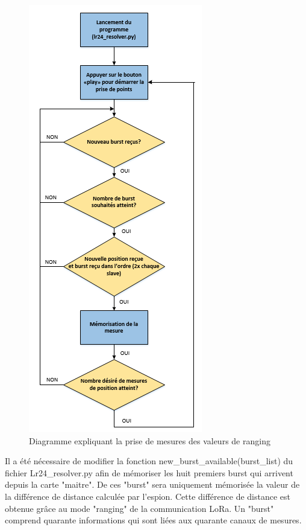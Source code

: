 \begin{figure}[htp]
	\begin{center}
		\includegraphics[scale=0.7]{figures/PriseMesures.png}
		\caption{Diagramme expliquant la prise de mesures des valeurs de ranging}
		\label{fig:mesures} %
	\end{center}
\end{figure}

Il a été nécessaire de modifier la fonction new\_burst\_available(burst\_list) du fichier Lr24\_resolver.py afin de mémoriser les huit premiers burst qui arrivent depuis la carte "maitre". De ces "burst" sera uniquement mémorisée la valeur de la différence de distance calculée par l'espion. Cette différence de distance est obtenue grâce au mode "ranging" de la communication LoRa. Un "burst" comprend quarante informations qui sont liées aux quarante canaux de mesures. 


